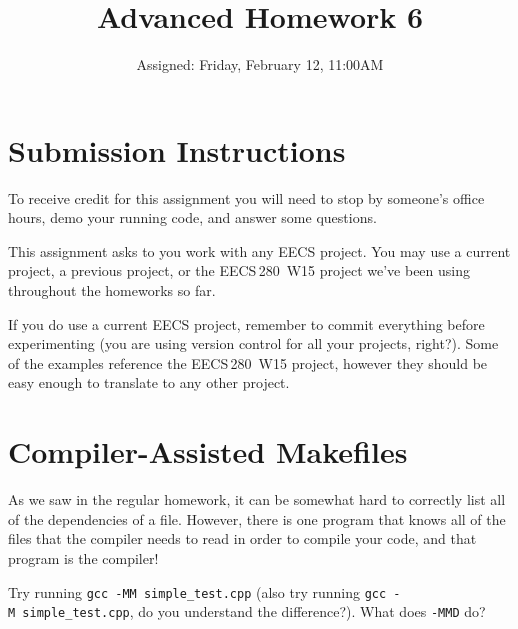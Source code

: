 \documentclass{article}
\begin{document}
\fancyfoot[C]{\color{gray} \thepage~/~\pageref*{LastPage}}
\pagestyle{fancyplain}


\title{\textbf{Advanced Homework 6\\}}
\author{Assigned: Friday, February 12, 11:00AM}
\date{\textbf{\color{red}{Due: Before the first lecture on Friday, February 26}}}
\maketitle


\section*{Submission Instructions}
To receive credit for this assignment you will need to stop by someone's
office hours, demo your running code, and answer some questions.

\begin{mdframed}[innerleftmargin=38pt,innerrightmargin=38pt]\justify
  This assignment asks to you work with any EECS project. You may use a
  current project, a previous project, or the EECS\,280~W15 project we've been
  using throughout the homeworks so far.

  If you do use a current EECS project, remember to commit everything before
  experimenting (you are using version control for all your projects, right?).
  Some of the examples reference the EECS\,280~W15 project, however they should
  be easy enough to translate to any other project.
\end{mdframed}

\section{Compiler-Assisted Makefiles}

As we saw in the regular homework, it can be somewhat hard to correctly list
all of the dependencies of a file. However, there is one program that knows
all of the files that the compiler needs to read in order to compile your
code, and that program is the compiler!

Try running \texttt{gcc~-MM~simple\_test.cpp} (also try running
\texttt{gcc~-M~simple\_test.cpp}, do you understand the difference?).
What does \texttt{-MMD} do?
\end{document}
